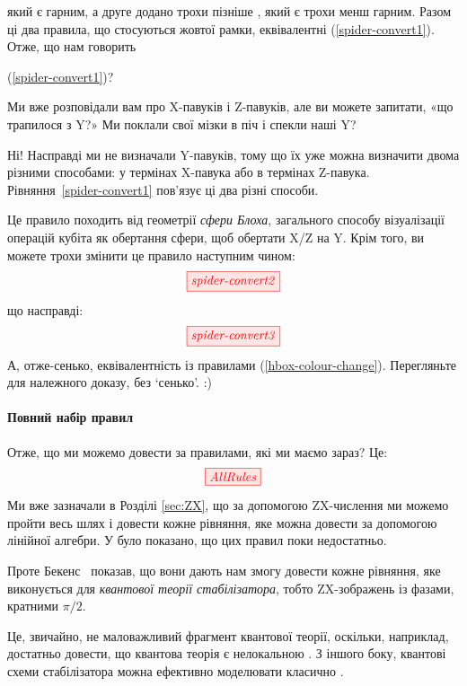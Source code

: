 \documentclass[11pt]{article}
\theoremstyle{definition}
\newcommand{\beq}{\begin{equation}}
\newcommand{\eeq}{\end{equation}\par\noindent}
\begin{document}
який є гарним, а друге додано трохи пізніше \cite{duncan2009graph}, який є трохи менш гарним. Разом ці два правила, що стосуються жовтої рамки, еквівалентні (\ref{spider-convert1}). Отже, що нам говорить {(\ref{spider-convert1})?

Ми вже розповідали вам про X-павуків і Z-павуків, але ви можете запитати, «що трапилося з Y?» Ми поклали свої мізки в піч і спекли наші Y?

Ні! Насправді ми не визначали Y-павуків, тому що їх уже можна визначити двома різними способами: у термінах X-павука або в термінах Z-павука. Рівняння~\eqref{spider-convert1} пов’язує ці два різні способи.

Це правило походить від геометрії \textit{сфери Блоха}, загального способу візуалізації операцій кубіта як обертання сфери, щоб обертати X/Z на Y. Крім того, ви можете трохи змінити це правило наступним чином:
\[
\tikzfig{spider-convert2}    
\]
що насправді:
\[
\tikzfig{spider-convert3}    
\]
А, отже-сенько, еквівалентність із правилами (\ref{hbox-colour-change}). Перегляньте \cite{CKbook} для належного доказу, без `сенько'. :)

\paragraph{Повний набір правил}  Отже, що ми можемо довести за правилами, які ми маємо зараз? Це:
\begin{equation}\label{stabrules}
\tikzfig{AllRules}
\end{equation}
Ми вже зазначали в Розділі \ref{sec:ZX}, що за допомогою ZX-числення ми можемо пройти весь шлях і довести кожне рівняння, яке можна довести за допомогою лінійної алгебри. У \cite{VladComp} було показано, що цих правил поки недостатньо.

Проте Бекенс~\cite{Backens} показав, що вони дають нам змогу довести кожне рівняння, яке виконується для \textit{квантової теорії стабілізатора}, тобто ZX-зображень із фазами, кратними $\pi/2$.


Це, звичайно, не маловажливий фрагмент квантової теорії, оскільки, наприклад, достатньо довести, що квантова теорія є нелокальною \cite{CDKZ}. З іншого боку, квантові схеми стабілізатора можна ефективно моделювати класично \cite{GottesmanKnill}.

}
\end{document}
